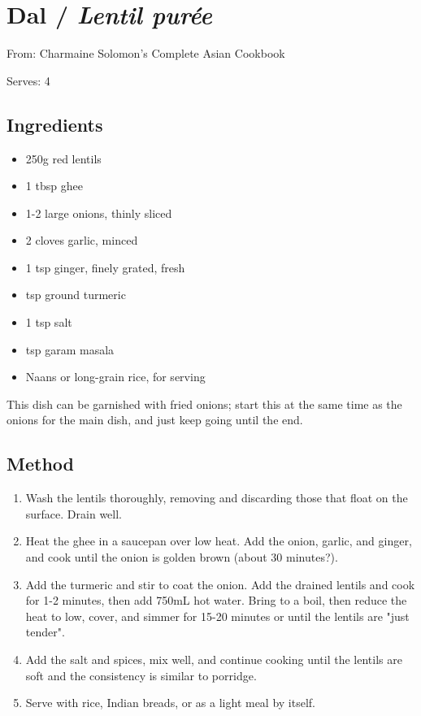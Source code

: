 \section{Dal / \emph{Lentil pur\'{e}e}}


From: Charmaine Solomon's Complete Asian Cookbook

Serves: 4

\subsection{Ingredients}

\begin{itemize}
	\item 250g red lentils
	\item 1 tbsp ghee
	\item 1-2 large onions, thinly sliced
	\item 2 cloves garlic, minced
	\item 1 tsp ginger, finely grated, fresh
	\item {} tsp ground turmeric
	\item 1 tsp salt
	\item {} tsp garam masala
	\item Naans or long-grain rice, for serving
\end{itemize}

This dish can be garnished with fried onions; start this at the same time as the onions for the main dish, and just keep going until the end.

\subsection{Method}

\begin{enumerate}
	\item Wash the lentils thoroughly, removing and discarding those that float on the surface. Drain well.
	\item Heat the ghee in a saucepan over low heat. Add the onion, garlic, and ginger, and cook until the onion is golden brown (about 30 minutes?).
	\item Add the turmeric and stir to coat the onion. Add the drained lentils and cook for 1-2 minutes, then add 750mL hot water. Bring to a boil, then reduce the heat to low, cover, and simmer for 15-20 minutes or until the lentils are "just tender".
	\item Add the salt and spices, mix well, and continue cooking until the lentils are soft and the consistency is similar to porridge.
	\item Serve with rice, Indian breads, or as a light meal by itself.
\end{enumerate}
